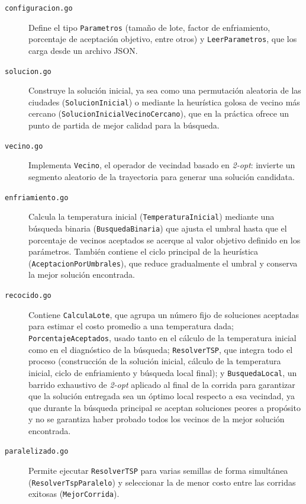 \documentclass[12pt,a4paper]{article}
\begin{document}
\begin{description}
  \item[\texttt{configuracion.go}] Define el tipo \texttt{Parametros} (tamaño de lote, factor de enfriamiento, porcentaje de aceptación objetivo, entre otros) y \texttt{LeerParametros}, que los carga desde un archivo JSON.
  \item[\texttt{solucion.go}] Construye la solución inicial, ya sea como una permutación aleatoria de las ciudades (\texttt{SolucionInicial}) o mediante la heurística golosa de vecino más cercano (\texttt{SolucionInicialVecinoCercano}), que en la práctica ofrece un punto de partida de mejor calidad para la búsqueda.
  \item[\texttt{vecino.go}] Implementa \texttt{Vecino}, el operador de vecindad basado en \textit{2-opt}: invierte un segmento aleatorio de la trayectoria para generar una solución candidata.
  \item[\texttt{enfriamiento.go}] Calcula la temperatura inicial (\texttt{TemperaturaInicial}) mediante una búsqueda binaria (\texttt{BusquedaBinaria}) que ajusta el umbral hasta que el porcentaje de vecinos aceptados se acerque al valor objetivo definido en los parámetros. También contiene el ciclo principal de la heurística (\texttt{AceptacionPorUmbrales}), que reduce gradualmente el umbral y conserva la mejor solución encontrada.
  \item[\texttt{recocido.go}] Contiene \texttt{CalculaLote}, que agrupa un número fijo de soluciones aceptadas para estimar el costo promedio a una temperatura dada; \texttt{PorcentajeAceptados}, usado tanto en el cálculo de la temperatura inicial como en el diagnóstico de la búsqueda; \texttt{ResolverTSP}, que integra todo el proceso (construcción de la solución inicial, cálculo de la temperatura inicial, ciclo de enfriamiento y búsqueda local final); y \texttt{BusquedaLocal}, un barrido exhaustivo de \textit{2-opt} aplicado al final de la corrida para garantizar que la solución entregada sea un óptimo local respecto a esa vecindad, ya que durante la búsqueda principal se aceptan soluciones peores a propósito y no se garantiza haber probado todos los vecinos de la mejor solución encontrada.
  \item[\texttt{paralelizado.go}] Permite ejecutar \texttt{ResolverTSP} para varias semillas de forma simultánea (\texttt{ResolverTspParalelo}) y seleccionar la de menor costo entre las corridas exitosas (\texttt{MejorCorrida}).
\end{description}
\end{document}
